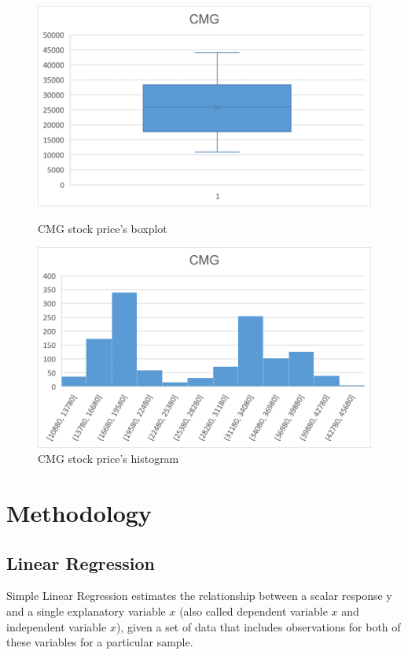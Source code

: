 \documentclass{ieeeojies}
\begin{document}
\begin{figure}[H]
    \centering
    \begin{minipage}{0.23\textwidth}
        \centering
        \includegraphics[width=1\textwidth]{bibliography/Figure/CMG_Quantiles.png}
        \caption{CMG stock price's boxplot}
        \label{fig:1}
    \end{minipage}
    \hfill
    \begin{minipage}{0.23\textwidth}
        \centering
        \includegraphics[width=1\textwidth]{bibliography/Figure/CMG_Bar.png}
        \caption{CMG stock price's histogram}
        \label{fig:2}
    \end{minipage}
\end{figure}
\section{Methodology}
\subsection{Linear Regression}
Simple Linear Regression estimates the relationship between a scalar response y and a single explanatory variable $x$ (also called dependent variable $x$ and independent variable $x$), given a set of data that includes observations for both of these variables for a particular sample. \cite{b5}
\end{document}
